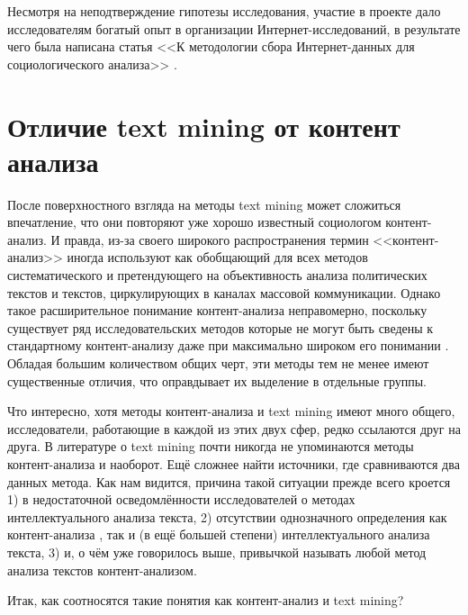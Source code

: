 Несмотря на неподтверждение гипотезы исследования, участие в проекте дало исследователям богатый опыт в организации Интернет-исследований, в результате чего была написана статья <<К методологии сбора Интернет-данных для социологического анализа>> \cite{methodlogy_internet}.

\section{Отличие text mining от контент анализа}

После поверхностного взгляда на методы text mining может сложиться впечатление, что они повторяют уже хорошо известный социологом контент-анализ. И правда, из-за своего широкого распространения термин <<контент-анализ>> иногда используют как обобщающий для всех методов систематического и претендующего на объективность анализа политических текстов и текстов, циркулирующих в каналах массовой коммуникации. Однако такое расширительное понимание контент-анализа неправомерно, поскольку существует ряд исследовательских методов  которые не могут быть сведены к стандартному контент-анализу даже при максимально широком его понимании \cite{Iudin2010}. Обладая большим количеством общих черт, эти методы тем не менее имеют существенные отличия, что оправдывает их выделение в отдельные группы.

Что интересно, хотя методы контент-анализа и text mining имеют много общего, исследователи, работающие в каждой из этих двух сфер, редко ссылаются друг на друга. В литературе о text mining почти никогда не упоминаются методы контент-анализа и наоборот. Ещё сложнее найти источники, где сравниваются два данных метода. Как нам видится, причина такой ситуации прежде всего кроется 1) в недостаточной осведомлённости исследователей о методах интеллектуального анализа текста, 2) отсутствии однозначного определения как контент-анализа \cite[стр. 156]{Lande2006}, так и (в ещё большей степени) интеллектуального анализа текста, 3) и, о чём уже говорилось выше, привычкой называть любой метод анализа текстов контент-анализом.

Итак, как соотносятся такие понятия как контент-анализ и text mining?

